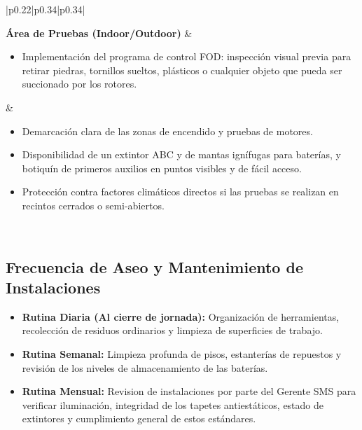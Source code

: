 \begin{longtable}{|p{0.22\textwidth}|p{0.34\textwidth}|p{0.34\textwidth}|}
\vspace{2pt} \raggedright \textbf{Área de Pruebas (Indoor/Outdoor)} & 
\begin{minipage}[t]{\linewidth}
\vspace{2pt}
\raggedright
\begin{itemize}[leftmargin=12pt, topsep=0pt, partopsep=0pt, parsep=0pt, itemsep=4pt]
    \item Implementación del programa de control FOD: inspección visual previa para retirar piedras, tornillos sueltos, plásticos o cualquier objeto que pueda ser succionado por los rotores.
\end{itemize}
\vspace{2pt}
\end{minipage} & 
\begin{minipage}[t]{\linewidth}
\vspace{2pt}
\raggedright
\begin{itemize}[leftmargin=12pt, topsep=0pt, partopsep=0pt, parsep=0pt, itemsep=4pt]
    \item Demarcación clara de las zonas de encendido y pruebas de motores.
    \item Disponibilidad de un extintor ABC y de mantas ignífugas para baterías, y botiquín de primeros auxilios en puntos visibles y de fácil acceso.
    \item Protección contra factores climáticos directos si las pruebas se realizan en recintos cerrados o semi-abiertos.
\end{itemize}
\vspace{2pt}
\end{minipage} \\ \hline

\end{longtable}

\subsection{Frecuencia de Aseo y Mantenimiento de Instalaciones}

\begin{itemize}
    \item \textbf{Rutina Diaria (Al cierre de jornada):} Organización de herramientas, recolección de residuos ordinarios y limpieza de superficies de trabajo.
    
    \item \textbf{Rutina Semanal:} Limpieza profunda de pisos, estanterías de repuestos y revisión de los niveles de almacenamiento de las baterías.

    \item \textbf{Rutina Mensual:} Revision de instalaciones por parte del Gerente SMS para verificar iluminación, integridad de los tapetes antiestáticos, estado de extintores y cumplimiento general de estos estándares.
\end{itemize}


